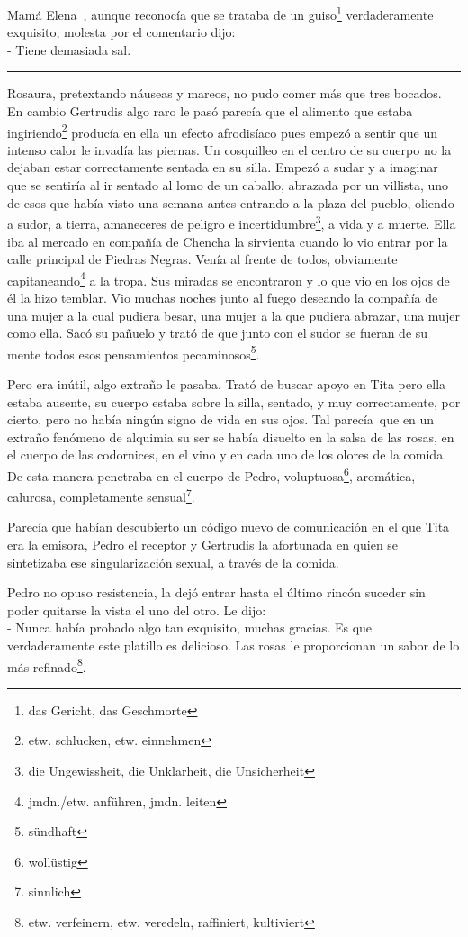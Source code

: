 Mamá Elena~, aunque reconocía que se trataba de un guiso\footnote{das Gericht, das Geschmorte}
verdaderamente exquisito, molesta por el comentario dijo:
\\- Tiene demasiada sal.\\
\rule{1em}{0pt}Rosaura, pretextando náuseas y mareos, no pudo comer más que tres
bocados. En cambio Gertrudis algo raro le pasó
parecía que el alimento que estaba ingiriendo\footnote{etw. schlucken, etw. einnehmen}
producía en ella un efecto afrodisíaco pues empezó a sentir que un intenso
calor le invadía las piernas. Un cosquilleo en el centro de su cuerpo
no la dejaban estar correctamente sentada en su silla. Empezó a sudar y
a imaginar que se sentiría al ir sentado al lomo de un caballo, abrazada
por un villista, uno de esos que había visto una semana antes entrando
a la plaza del pueblo, oliendo a sudor, a tierra, amaneceres de peligro e incertidumbre\footnote{die Ungewissheit, die Unklarheit, die Unsicherheit},
a vida y a muerte. Ella iba al mercado en compañía de
Chencha la sirvienta cuando lo vio entrar por la calle principal de
Piedras Negras. Venía al frente de todos, obviamente capitaneando\footnote{jmdn./etw. anführen, jmdn. leiten}
a la tropa. Sus miradas se encontraron y lo que vio en los ojos de él la hizo
temblar. Vio muchas noches junto al fuego deseando la compañía de una
mujer a la cual pudiera besar, una mujer a la que pudiera abrazar, una
mujer \ndots como ella. Sacó su pañuelo y trató de que junto con el
sudor se fueran de su mente todos esos pensamientos pecaminosos\footnote{sündhaft}.

Pero era inútil, algo extraño le pasaba. Trató de buscar apoyo en Tita
pero ella estaba ausente, su cuerpo estaba sobre la silla, sentado, y
muy correctamente, por cierto, pero no había ningún signo de vida en sus
ojos. Tal parecía~que en un extraño fenómeno de alquimia su ser se
había disuelto en la salsa de las rosas, en el cuerpo de las codornices,
en el vino y en cada uno de los olores de la comida. De esta manera
penetraba en el cuerpo de Pedro, voluptuosa\footnote{wollüstig},
aromática, calurosa, completamente sensual\footnote{sinnlich}.

Parecía que habían descubierto un código nuevo de comunicación en el que
Tita era la emisora, Pedro el receptor y Gertrudis la afortunada en
quien se sintetizaba ese singularización sexual, a través de la comida.

Pedro no opuso resistencia, la dejó entrar hasta el último rincón
suceder sin poder quitarse la vista el uno del otro. Le dijo:
\\- Nunca había probado algo tan exquisito, muchas gracias. %
Es que verdaderamente este platillo es delicioso. Las rosas le %
proporcionan un sabor de lo más refinado\footnote{etw. verfeinern, etw. veredeln, raffiniert, kultiviert}.\\

